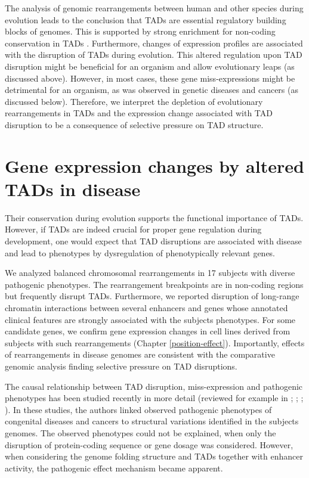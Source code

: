 \documentclass[a4paper,twoside=true,openright,parskip=full,chapterprefix=true,11pt,headings=normal,bibliography=totoc,listof=totoc,titlepage=on,captions=tableabove,draft=false]{scrreprt}
\theoremstyle{definition}
\theoremstyle{definition}
\theoremstyle{definition}
\theoremstyle{remark}
\begin{document}
The analysis of genomic rearrangements between human and other species
during evolution leads to the conclusion that TADs are essential
regulatory building blocks of genomes. This is supported by strong
enrichment for non-coding conservation in TADs \citep{Harmston2017}.
Furthermore, changes of expression profiles are associated with the
disruption of TADs during evolution. This altered regulation upon TAD
disruption might be beneficial for an organism and allow evolutionary
leaps (as discussed above). However, in most cases, these gene
miss-expressions might be detrimental for an organism, as was observed
in genetic diseases \citep{Ibn-Salem2014, Lupianez2015} and cancers (as
discussed below). Therefore, we interpret the depletion of evolutionary
rearrangements in TADs and the expression change associated with TAD
disruption to be a consequence of selective pressure on TAD structure.

\hypertarget{TAD-disease}{%
\section{Gene expression changes by altered TADs in
disease}\label{TAD-disease}}

Their conservation during evolution supports the functional importance
of TADs. However, if TADs are indeed crucial for proper gene regulation
during development, one would expect that TAD disruptions are associated
with disease and lead to phenotypes by dysregulation of phenotypically
relevant genes.

We analyzed balanced chromosomal rearrangements in 17 subjects with
diverse pathogenic phenotypes. The rearrangement breakpoints are in
non-coding regions but frequently disrupt TADs. Furthermore, we reported
disruption of long-range chromatin interactions between several
enhancers and genes whose annotated clinical features are strongly
associated with the subjects phenotypes. For some candidate genes, we
confirm gene expression changes in cell lines derived from subjects with
such rearrangements (Chapter \ref{position-effect}). Importantly,
effects of rearrangements in disease genomes are consistent with the
comparative genomic analysis finding selective pressure on TAD
disruptions.

The causal relationship between TAD disruption, miss-expression and
pathogenic phenotypes has been studied recently in more detail (reviewed
for example in \citet{Krijger2016}; \citet{Achinger-Kawecka2017};
\citet{Yu2017}; \citet{Andrey2017}). In these studies, the authors
linked observed pathogenic phenotypes of congenital diseases and cancers
to structural variations identified in the subjects genomes. The
observed phenotypes could not be explained, when only the disruption of
protein-coding sequence or gene dosage was considered. However, when
considering the genome folding structure and TADs together with enhancer
activity, the pathogenic effect mechanism became apparent.
\end{document}
